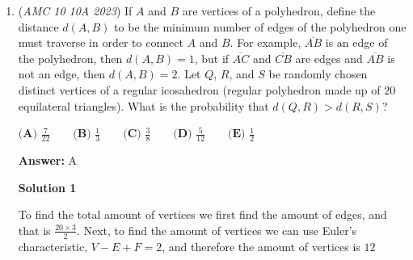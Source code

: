 \begin{enumerate}
$(3^2-6\times 1^2)\times\frac{3\sqrt{3}}{2}=(9-6\times 1)\times\frac{3\sqrt{3}}{2}=(9-6)\times\frac{3\sqrt{3}}{2}=3\times\frac{3\sqrt{3}}{2}=\boxed{\textbf{(C) } \frac{9 \sqrt{3}}{2}}$




\textbf{Solution 4 (educated guessing)}

Since the area of each hexagon is $\frac{3 \sqrt{3}}{2}$, the answer is just the area of the large hexagon minus $9\sqrt{3}$. The side length of the large hexagon should be an integer or fraction since we are given integers and fractions, and solving this problem shouldn't require any square roots. Therefore, the correct answer plus $9\sqrt{3}$ should be the product of $\frac{3 \sqrt{3}}{2}$ and a square number. Only choice $\text{C}$ satisfies this, since $\frac{9 \sqrt{3}}{2} + 9\sqrt{3}=\frac{27 \sqrt{3}}{2}=3^2\times\frac{3 \sqrt{3}}{2}$. Alternatively, we can also deduce $\text{C}$ is correct since it is the only fraction whose denominator is ${2}$. Therefore, the answer is (probably) $\boxed{\textbf{(C)}~\frac{9 \sqrt{3}}{2}}$

 -faliure167

 \textit{ ~Education, the Study of Everything }

 


	\item (\textit{AMC 10 10A 2023}) If $A$ and $B$ are vertices of a polyhedron, define the distance $d(A, B)$ to be the minimum number of edges of the polyhedron one must traverse in order to connect $A$ and $B$. For example, $\overline{AB}$ is an edge of the polyhedron, then $d(A, B) = 1$, but if $\overline{AC}$ and $\overline{CB}$ are edges and $\overline{AB}$ is not an edge, then $d(A, B) = 2$. Let $Q$, $R$, and $S$ be randomly chosen distinct vertices of a regular icosahedron (regular polyhedron made up of $20$ equilateral triangles). What is the probability that $d(Q, R) > d(R, S)$?


 $\textbf{(A) }\frac{7}{22}\qquad\textbf{(B) }\frac{1}{3}\qquad\textbf{(C) }\frac{3}{8}\qquad\textbf{(D) }\frac{5}{12}\qquad\textbf{(E) }\frac{1}{2}$

 \textbf{Answer: }A



\textbf{Solution 1}

To find the total amount of vertices we first find the amount of edges, and that is $\frac{20 \times 3}{2}$. Next, to find the amount of vertices we can use Euler's characteristic, $V - E + F = 2$, and therefore the amount of vertices is $12$ 


\end{enumerate}
